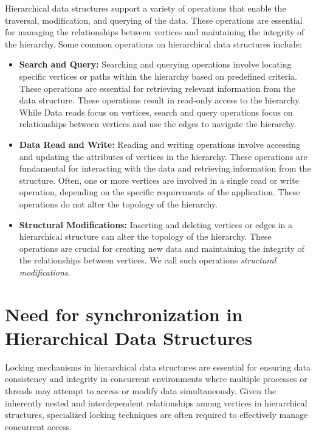 Hierarchical data structures support a variety of operations that enable the traversal, modification, and querying of the data. These operations are essential for managing the relationships between vertices and maintaining the integrity of the hierarchy. Some common operations on hierarchical data structures include:

\begin{itemize}

    \item \textbf{Search and Query:} Searching and querying operations involve locating specific vertices or paths within the hierarchy based on predefined criteria. These operations are essential for retrieving relevant information from the data structure. These operations result in read-only access to the hierarchy. While Data reads focus on vertices, search and query operations focus on relationships between vertices and use the edges to navigate the hierarchy.
    
    \item \textbf{Data Read and Write:} Reading and writing operations involve accessing and updating the attributes of vertices in the hierarchy. These operations are fundamental for interacting with the data and retrieving information from the structure. Often, one or more vertices are involved in a single read or write operation, depending on the specific requirements of the application. These operations do not alter the topology of the hierarchy.

    \item \textbf{Structural Modifications:} Inserting and deleting vertices or edges in a hierarchical structure can alter the topology of the hierarchy. These operations are crucial for creating new data and maintaining the integrity of the relationships between vertices. We call such operations \emph{structural modifications}.
    

\end{itemize}


\section{Need for synchronization in Hierarchical Data Structures} \label{sec:multicoresystemsandconcurrencycontrol}
Locking mechanisms in hierarchical data structures are essential for ensuring data consistency and integrity in concurrent environments where multiple processes or threads may attempt to access or modify data simultaneously. Given the inherently nested and interdependent relationships among vertices in hierarchical structures, specialized locking techniques are often required to effectively manage concurrent access.

